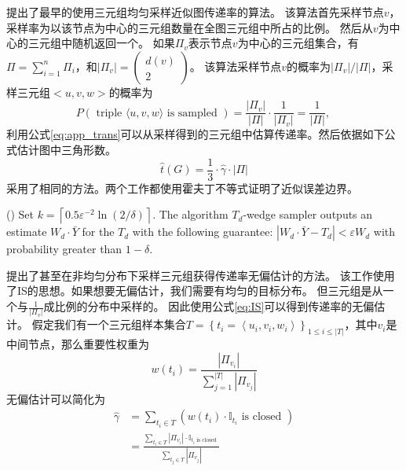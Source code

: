 \cite{schank2005approximating}提出了最早的使用三元组均匀采样近似图传递率的算法。
该算法首先采样节点$v$，采样率为以该节点为中心的三元组数量在全图三元组中所占的比例。
然后从$v$为中心的三元组中随机返回一个。
如果$\Pi_{v}$表示节点$v$为中心的三元组集合，有
$\Pi=\sum_{i=1}^{n} \Pi_{i}$，和$\left|\Pi_{v}\right|=\left(\begin{array}{c}d(v) \\2\end{array}\right)$。
该算法采样节点$v$的概率为$|\Pi_{v}|/|\Pi|$，采样三元组$<u,v,w>$的概率为
\begin{equation}
    P(\text { triple }\langle u, v, w\rangle \text { is sampled })=\frac{\left|\Pi_{v}\right|}{|\Pi|} \cdot \frac{1}{|\Pi_{v}|}=\frac{1}{|\Pi|} \text {, }
\end{equation}
利用公式\ref{eq:app_trans}可以从采样得到的三元组中估算传递率。然后依据如下公式估计图中三角形数。
\begin{equation}
    \hat{t}(G)=\frac{1}{3} \cdot \hat{\gamma} \cdot|\Pi|
\end{equation}
\cite{seshadhri2013triadic}采用了相同的方法。两个工作都使用霍夫丁不等式证明了近似误差边界。
\begin{theorem}
    (\cite{seshadhri2013triadic}) Set $k=\left\lceil 0.5 \varepsilon^{-2} \ln (2 / \delta)\right\rceil$. The algorithm $T_{d}$-wedge sampler outputs an estimate $W_{d} \cdot \bar{Y}$ for
    the $T_{d}$ with the following guarantee: $\left|W_{d} \cdot \bar{Y}-T_{d}\right|<\varepsilon W_{d}$
    with probability greater than $1 - \delta$.
\end{theorem}

\cite{al2016methods}提出了甚至在非均匀分布下采样三元组获得传递率无偏估计的方法。
该工作使用了IS的思想。如果想要无偏估计，我们需要有均匀的目标分布。
但三元组是从一个与$\frac{1}{|\Pi_{v}|}$成比例的分布中采样的。
因此使用公式\ref{eq:IS}可以得到传递率的无偏估计。
假定我们有一个三元组样本集合$T=\left\{t_{i}=\left\langle u_{i}, v_{i}, w_{i}\right\rangle\right\}_{1 \leq i \leq|T|}$，其中$v_{i}$是中间节点，那么重要性权重为
\begin{equation}
    w\left(t_{i}\right)=\frac{\left|\Pi_{v_{i}}\right|}{\sum_{j=1}^{|T|}\left|\Pi_{v_{j}}\right|}
\end{equation}
无偏估计可以简化为
\begin{equation}
    \begin{aligned}
        \hat{\gamma} &=\sum_{t_{i} \in T}\left(w\left(t_{i}\right) \cdot \mathbb{I}_{t_{i}} \text { is closed }\right) \\
        &=\frac{\sum_{t_{i} \in T}\left|\Pi_{v_{i}}\right| \cdot \mathbb{I}_{t_{i} \text { is closed }}}{\sum_{t_{j} \in T}\left|\Pi_{v_{j}}\right|}
        \end{aligned}
\end{equation}

